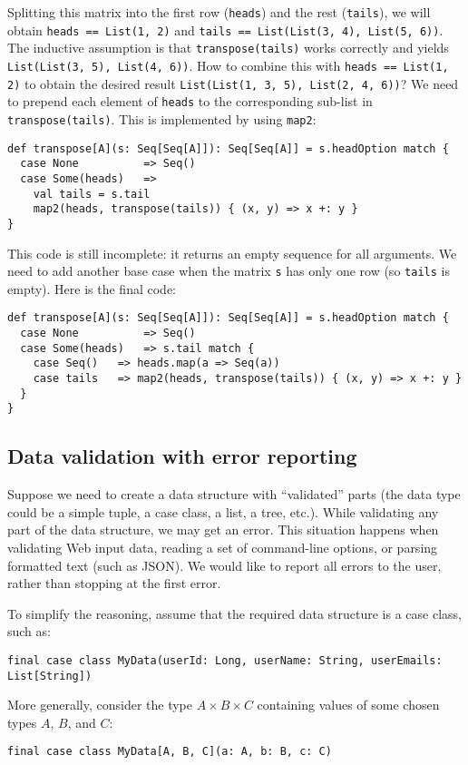 Splitting this matrix into the first row (\lstinline!heads!) and
the rest (\lstinline!tails!), we will obtain \lstinline!heads == List(1, 2)!
and \lstinline!tails == List(List(3, 4), List(5, 6))!. The inductive
assumption is that \lstinline!transpose(tails)! works correctly and
yields \lstinline!List(List(3, 5), List(4, 6))!. How to combine this
with \lstinline!heads == List(1, 2)! to obtain the desired result
\lstinline!List(List(1, 3, 5), List(2, 4, 6))!? We need to prepend
each element of \lstinline!heads! to the corresponding sub-list in
\lstinline!transpose(tails)!. This is implemented by using \lstinline!map2!:
\begin{lstlisting}
def transpose[A](s: Seq[Seq[A]]): Seq[Seq[A]] = s.headOption match {
  case None          => Seq()
  case Some(heads)   =>
    val tails = s.tail
    map2(heads, transpose(tails)) { (x, y) => x +: y }
}
\end{lstlisting}
This code is still incomplete: it returns an empty sequence for all
arguments. We need to add another base case when the matrix \lstinline!s!
has only one row (so \lstinline!tails! is empty). Here is the final
code:
\begin{lstlisting}
def transpose[A](s: Seq[Seq[A]]): Seq[Seq[A]] = s.headOption match {
  case None          => Seq()
  case Some(heads)   => s.tail match {
    case Seq()   => heads.map(a => Seq(a))
    case tails   => map2(heads, transpose(tails)) { (x, y) => x +: y }
  }
}
\end{lstlisting}


\subsection{Data validation with error reporting}

Suppose we need to create a data structure with \textsf{``}validated\textsf{''} parts
(the data type could be a simple tuple, a case class, a list, a tree,
etc.). While validating any part of the data structure, we may get
an error. This situation happens when validating Web input data, reading
a set of command-line options, or parsing formatted text (such as
JSON). We would like to report all errors to the user, rather than
stopping at the first error. 

To simplify the reasoning, assume that the required data structure
is a case class, such as:
\begin{lstlisting}
final case class MyData(userId: Long, userName: String, userEmails: List[String])
\end{lstlisting}
More generally, consider the type $A\times B\times C$ containing
values of some chosen types $A$, $B$, and $C$:
\begin{lstlisting}
final case class MyData[A, B, C](a: A, b: B, c: C)
\end{lstlisting}


